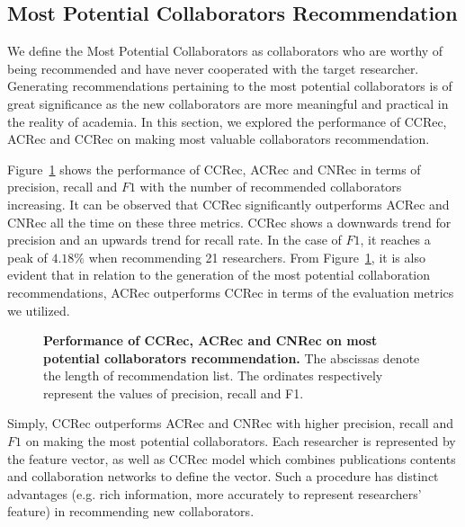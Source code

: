 \documentclass[10pt,letterpaper]{article}
\begin{document}
\subsection*{Most Potential Collaborators Recommendation}
We define the Most Potential Collaborators as collaborators who are worthy of being recommended and have never cooperated with the target researcher. Generating recommendations pertaining to the most potential collaborators is of great significance as the new collaborators are more meaningful and practical in the reality of academia. In this section, we explored the performance of CCRec, ACRec and CCRec on making most valuable collaborators recommendation.

Figure~\ref{Fig. 4} shows the performance of CCRec, ACRec and CNRec in terms of precision, recall and $F1$ with the number of recommended collaborators increasing. It can be observed that CCRec significantly outperforms ACRec and CNRec all the time on these three metrics. CCRec shows a downwards trend for precision and an upwards trend for recall rate. In the case of $F1$, it reaches a peak of $4.18\%$ when recommending 21 researchers. From Figure~\ref{Fig. 4}, it is also evident that in relation to the generation of the most potential collaboration recommendations, ACRec outperforms CCRec in terms of the evaluation metrics we utilized.

\begin{figure}[!hbt]
\caption{{\bf Performance of CCRec, ACRec and CNRec on most potential collaborators recommendation.} The abscissas denote the length of recommendation list. The ordinates respectively represent the values of precision, recall and F1.}
\label{Fig. 4}
\end{figure}

Simply, CCRec outperforms ACRec and CNRec with higher precision, recall and $F1$ on making the most potential collaborators. Each researcher is represented by the feature vector, as well as CCRec model which combines publications contents and collaboration networks to define the vector. Such a procedure has distinct advantages (e.g. rich information, more accurately to represent researchers' feature) in recommending new collaborators.
\end{document}
